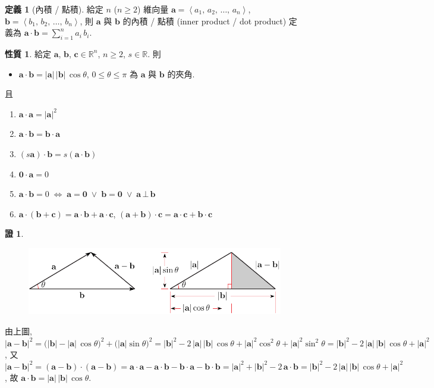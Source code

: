 \documentclass[12pt]{extarticle}
\newcommand{\ds}{\displaystyle}
\newcommand{\ifff}{\;\Longleftrightarrow\;}
\newcommand{\llt}{\left\langle}
\newcommand{\rgt}{\right\rangle}
\theoremstyle{definition}
\newtheorem*{dfn}{定義}
\newtheorem*{prp}{性質}
\newtheorem*{prf}{證}
\newcommand{\va}{\mathbf{a}}
\newcommand{\vb}{\mathbf{b}}
\newcommand{\vc}{\mathbf{c}}
\newcommand{\vZero}{\mathbf{0}}
\begin{document}
\begin{dfn}[內積 / 點積]
  給定 $n$ ($n\geqslant 2$) 維向量 $\va = \llt a_1,\,a_2,\,\ldots,\,a_n\rgt$, $\vb = \llt b_1,\,b_2,\,\ldots,\,b_n\rgt$, 則 $\va$ 與 $\vb$ 的內積 / 點積 (inner product / dot product) 定義為 $\ds\va\cdot\vb = \sum_{i = 1}^n a_i\,b_i$. 
\end{dfn}

\begin{prp} 給定 $\va$, $\vb$, $\vc\in\mathbb{R}^n$, $n\geqslant 2$, $s\in\mathbb{R}$. 則
  \begin{itemize}\setlength{\itemsep}{0pt}
    \item $\va\cdot\vb = |\va|\,|\vb|\,\cos\theta$, $0\leqslant\theta\leqslant\pi$ 為 $\va$ 與 $\vb$ 的夾角. 
  \end{itemize}
  且
  \setlength{\columnsep}{-20mm}
  \begin{multicols}{2}
    \begin{enumerate}\setlength{\itemsep}{0pt}
      \item $\va\cdot\va = |\va|^2$
      \item $\va\cdot\vb = \vb\cdot\va$
      \item $(s\va)\cdot\vb = s(\va\cdot\vb)$
      \item $\vZero\cdot\va = 0$
      \item $\va\cdot\vb = 0\ifff\va=\vZero\;\vee\;\vb = \vZero\;\vee\;\va\,\bot\,\vb$
      \item $\va\cdot(\vb + \vc) = \va\cdot\vb + \va\cdot\vc$, $(\va + \vb)\cdot\vc = \va\cdot\vc + \vb\cdot\vc$
    \end{enumerate}
  \end{multicols}
\end{prp}

\begin{prf}
  \begin{figure}[!htbp]
    \centering
    \includegraphics[scale=1,page=1]{fig/cosineB.pdf}
  \end{figure}
  由上圖, $\ds|\va-\vb|^2 = \big(|\vb|-|\va|\,\cos\theta\big)^2 + \big(|\va|\sin\theta\big)^2 = |\vb|^2 - 2\,|\va|\,|\vb|\,\cos\theta + |\va|^2\cos^2\theta + |\va|^2\sin^2\theta = |\vb|^2 - 2\,|\va|\,|\vb|\,\cos\theta + |\va|^2$, 又 $\ds|\va - \vb|^2 = (\va - \vb)\cdot(\va - \vb) = \va\cdot\va - \va\cdot\vb - \vb\cdot\va - \vb\cdot\vb = |\va|^2 + |\vb|^2 - 2\,\va\cdot\vb = |\vb|^2 - 2\,|\va|\,|\vb|\,\cos\theta + |\va|^2$, 故 $\va\cdot\vb = |\va|\,|\vb|\,\cos\theta$. 
\end{prf}
\end{document}
